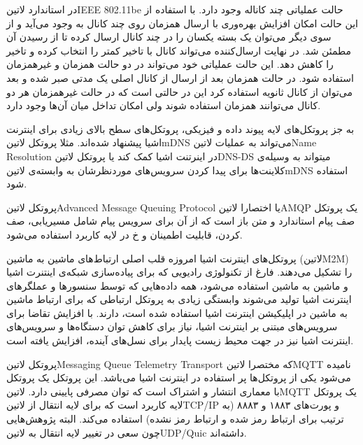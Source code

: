 در استاندارد ‌لاتین{IEEE 802.11be} حالت عملیاتی چند کاناله وجود دارد. با استفاده از این حالت امکان افزایش بهره‌وری با ارسال همزمان
روی چند کانال به وجود می‌آید و از سوی دیگر می‌توان یک بسته یکسان را در چند کانال ارسال کرده تا از رسیدن آن مطمئن شد. در نهایت ارسال‌کننده
می‌تواند کانال با تاخیر کمتر را انتخاب کرده و تاخیر را کاهش دهد. این حالت عملیاتی خود می‌تواند در دو حالت همزمان و غیرهمزمان استفاده شود.
در حالت همزمان بعد از ارسال از کانال اصلی یک مدتی صبر شده و بعد می‌توان از کانال ثانویه استفاده کرد این در حالتی است که در حالت غیرهمزمان
هر دو کانال می‌توانند همزمان استفاده شوند ولی امکان تداخل میان آن‌ها وجود دارد.



به جز پروتکل‌های لایه پیوند داده و فیزیکی، پروتکل‌های سطح بالای زیادی برای اینترنت اشیا پیشنهاد شده‌اند.
مثلا پروتکل ‌لاتین{mDNS} می‌تواند به عملیات ‌لاتین{Name Resolution} در اینرتنت اشیا کمک کند یا پروتکل
‌لاتین{DNS-DS} میتواند به وسیله‌ی کلاینت‌ها برای پیدا کردن سرویس‌های موردنظرشان به وابسته‌ی ‌لاتین{mDNS} استفاده شود.


پروتکل ‌لاتین{Advanced Message Queuing Protocol} یا اختصارا ‌لاتین{AMQP} یک پروتکل صف پیام استاندارد و متن باز است
که از آن برای سرویس پیام شامل مسیریابی، صف کردن، قابلیت اطمینان و ‌خ در لایه کاربرد استفاده می‌شود.


پروتکل‌های اینترنت اشیا امروزه قلب اصلی ارتباط‌های ماشین به ماشین (‌لاتین{M2M}) را تشکیل می‌دهند. فارغ از تکنولوژی رادیویی که برای پیاده‌سازی شبکه‌ی اینتنرت اشیا و ماشین به ماشین استفاده می‌شود، همه داده‌هایی که توسط سنسورها و عملگرهای اینترنت اشیا
تولید می‌شوند وابستگی زیادی به پروتکل ارتباطی که برای ارتباط ماشین به ماشین در اپلیکیشن اینترنت اشیا استفاده شده است، دارند.
با افزایش تقاضا برای سرویس‌های مبتنی بر اینترنت اشیا، نیاز برای کاهش توان دستگاه‌ها و سرویس‌های اینترنت اشیا نیز در جهت محیط زیست پایدار برای نسل‌های آینده، افزایش یافته است.

پروتکل ‌لاتین{Messaging Queue Telemetry Transport} که مختصرا ‌لاتین{MQTT} نامیده می‌شود یکی از پروتکل‌ها پر استفاده در اینترنت اشیا می‌باشد.
این پروتکل یک پروتکل با معماری انتشار و اشتراک است که توان مصرفی پایینی دارد.
‌لاتین{MQTT} یک پروتکل لایه کاربرد است که برای لایه انتقال از ‌لاتین{TCP/IP} و پورت‌های ۱۸۸۳ و ۸۸۸۳ (به ترتیب برای ارتباط رمز شده و ارتباط رمز نشده) استفاده می‌کند. البته پژوهش‌هایی چون  سعی در تغییر لایه انتقال به ‌لاتین{UDP/Quic} داشته‌اند.

